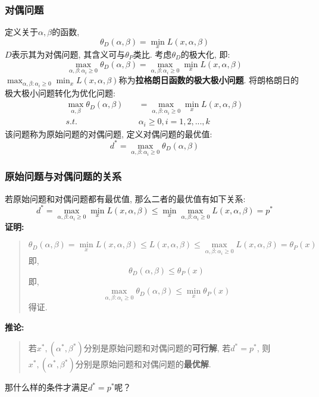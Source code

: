 \subsubsection{对偶问题}
定义关于$\alpha, \beta$的函数, 
$$
\theta_D(\alpha, \beta) = \mathop{min}_{x} L(x, \alpha, \beta)
$$
$D$表示其为对偶问题, 其含义可与$\theta_P$类比. 考虑$\theta_D$的极大化, 即: 
$$
\mathop{max}_{\alpha, \beta: \alpha_i \geqslant 0} \theta_D(\alpha, \beta) = \mathop{max}_{\alpha, \beta: \alpha_i \geqslant 0} \mathop{min}_{x} L(x, \alpha, \beta)
$$
$\mathop{max}_{\alpha, \beta: \alpha_i \geqslant 0} \mathop{min}_{x} L(x, \alpha, \beta)$称为\textbf{拉格朗日函数的极大极小问题}. 将朗格朗日的极大极小问题转化为优化问题: 
\begin{align}
	\mathop{max}_{\alpha, \beta} \theta_D(\alpha, \beta)&\quad = \mathop{max}_{\alpha, \beta: \alpha_i \geqslant 0} \mathop{min}_{x} L(x, \alpha, \beta) \nonumber \\
	s.t.&\quad \alpha_i \geqslant 0, i = 1, 2, ..., k \nonumber
\end{align}
该问题称为原始问题的对偶问题, 定义对偶问题的最优值: 
$$
d^* = \mathop{max}_{\alpha, \beta: \alpha_i \geqslant 0} \theta_D(\alpha, \beta)
$$

\subsubsection{原始问题与对偶问题的关系}
若原始问题和对偶问题都有最优值, 那么二者的最优值有如下关系: 
$$
d^* = \mathop{max}_{\alpha, \beta: \alpha_i \geqslant 0} \mathop{min}_{x} L(x, \alpha, \beta) \leqslant \mathop{min}_{x} \mathop{max}_{\alpha, \beta: \alpha_i \geqslant 0} L(x, \alpha, \beta) = p^*
$$
\textbf{证明: }
\begin{quotation}
	$$
	\theta_D(\alpha, \beta) = \mathop{min}_{x} L(x, \alpha, \beta) \leqslant L(x, \alpha, \beta) \leqslant \mathop{max}_{\alpha, \beta: \alpha_i \geqslant 0} L(x, \alpha, \beta) = \theta_P(x)
	$$
	即, 
	$$
	\theta_D (\alpha, \beta) \leqslant \theta_P (x)
	$$
	即, 
	$$
	\mathop{max}_{\alpha, \beta:\alpha_i \geqslant 0} \theta_D (\alpha, \beta) \leqslant \mathop{min}_{x} \theta_P (x)
	$$
	得证. 
\end{quotation}
\textbf{推论: }
\begin{quotation}
	若$x^*, (\alpha^*, \beta^*)$分别是原始问题和对偶问题的\textbf{可行解}, 若$d^* = p^*$, 则$x^*, (\alpha^*, \beta^*)$分别是原始问题和对偶问题的\textbf{最优解}. 
\end{quotation} 
那什么样的条件才满足$d^* = p^*$呢？

